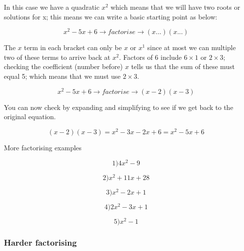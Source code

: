 In this case we have a quadratic $ x^{2}$ which means that we will have two roots or solutions for x; this means we can write a basic starting point as below:

\begin{equation} \label{eq:expand}
  x^{2}-5x + 6 \rightarrow factorise \rightarrow \left ( x ... \right) \left ( x ... \right )
\end{equation}

The $x$ term in each bracket can only be $x$ or $x^{1}$ since at most we can multiple two of these terms to arrive back at $x^{2}$. Factors of 6 include $ 6 \times 1 $ or $ 2 \times 3$; checking the coefficient (number before) $x$ tells us that the sum of these must equal 5; which means that we must use $ 2 \times 3$.

\begin{equation} \label{eq:expand}
  x^{2}-5x + 6 \rightarrow factorise \rightarrow \left ( x - 2 \right) \left ( x - 3 \right )
\end{equation}

You can now check by expanding and simplifying to see if we get back to the original equation.

\begin{equation} \label{eq:expand}
  \left ( x - 2 \right) \left ( x - 3 \right ) = x^{2} -3x -2x +6 = x^{2} -5x +6
\end{equation}

More factorising examples

\begin{equation} 
 1)  4x^{2} - 9
\end{equation}

\begin{equation} 
 2)  x^{2} + 11x + 28
\end{equation}

\begin{equation} 
 3)  x^{2} - 2x + 1
\end{equation}

\begin{equation} 
 4)  2x^{2} - 3x + 1
\end{equation}

\begin{equation} 
 5)  x^{2} - 1
\end{equation}

\subsubsection{Harder factorising}

